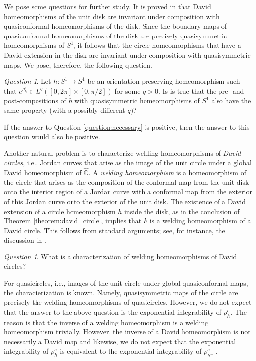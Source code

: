 \documentclass{amsart}
\theoremstyle{plain}
\theoremstyle{definition}
\theoremstyle{remark}
\newtheorem{question}[theorem]{Question}
\numberwithin{equation}{section}
\numberwithin{theorem}{section}
\numberwithin{conjecture}{section}
\newcommand{\C}{\mathbb C}
\newcommand{\1}{\mathbf 1}
\begin{document}
We pose some questions for further study. It is proved in \cite[Proposition 2.5]{LyubichMerenkovMukherjeeNtalampekos:David} that David homeomorphisms of the unit disk are invariant under composition with quasiconformal homeomorphisms of the disk. Since the boundary maps of quasiconformal homeomorphisms of the disk are precisely quasisymmetric homeomorphisms of $S^1$, it follows that the circle homeomorphisms that have a David extension in the disk are invariant under composition with quasisymmetric maps. We pose, therefore, the following question.
\begin{question}
Let $h\colon S^1\to S^1$ be an orientation-preserving homeomorphism such that $e^{\rho_h^c}\in L^q([0,2\pi]\times [0,\pi/2])$ for some $q>0$. Is is true that the pre- and post-compositions of $h$ with quasisymmetric homeomorphisms of $S^1$ also have the same property (with a possibly different $q$)?
\end{question}
If the answer to Question \ref{question:necessary} is positive, then the answer to this question would also be positive.

Another natural problem is to characterize {welding homeomorphisms} of \textit{David circles}, i.e., Jordan curves that arise as the image of the unit circle under a global David homeomorphism of $\widehat{\C}$. A \textit{welding homeomorphism} is a homeomorphism of the circle that arises as the composition of the conformal map from the unit disk onto the interior region of a Jordan curve with a conformal map from the  exterior of this Jordan curve onto the exterior of the unit disk. The existence of a David extension of a circle homeomorphism $h$ inside the disk, as in the conclusion of Theorem \ref{theorem:david_circle}, implies that $h$ is a welding homeomorphism of a David circle. This follows from standard arguments; see, for instance, the discussion in \cite[Section 5]{LyubichMerenkovMukherjeeNtalampekos:David}. 

\begin{question}
What is a characterization of welding homeomorphisms of David circles?
\end{question}
For quasicircles, i.e., images of the unit circle under global quasiconformal maps, the characterization is known. Namely, quasisymmetric maps of the circle are precisely the welding homeomorphisms of quasicircles. However, we do not expect that the answer to the above question is the exponential integrability of $\rho_h^c$. The reason is that the inverse of a welding homeomorphism is a welding homeomorphism trivially. However, the inverse of a David homeomorphism is not necessarily a David map and likewise, we do not expect that the exponential integrability of $\rho_h^c$ is equivalent to the exponential integrability of $\rho_{h^{-1}}^c$.
\end{document}
